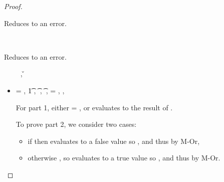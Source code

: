 \begin{lemma}
\begin{proof}
\begin{case}[BE-Assoc2]
  Reduces to an error.
\end{case}

\begin{case}[BE-Assoc3]
  \ 

  Reduces to an error.
\end{case}

\begin{case}[B-IfFalse]
        \opsem {\openv{}} {} {\false}
        \ \ \ \ 
        \opsem {\openv{}} {} {\nil},
        \opsem {\openv{}} {} {\v{}}

  \begin{itemize}
    \item[]
      \begin{subcase}[T-If]
  \ep{} = { {} {}},
  \judgementrewrite {\propenv{}} {\ep1} {\t{1}} { {}}
                 {\object{1}}
                 {},
                 {} {\t{}} { {}}
                 {\object{}}
                 {},
                 {} {\t{}} { {}}
                 {\object{}}
                 {},
  \e{} = { {} {}},
  ,
  \inpropenv{\orprop {\elseprop {\prop{2}}} {\elseprop {\prop{3}}}}{\elseprop{\prop{}}}

              For part 1, either \object{} = \emptyobject{}, or \e{} evaluates to the
              result of \e{3}.

              To prove part 2, we consider two cases:
              \begin{itemize}
                \item if \isfalseval{\v{}}
                  then  evaluates to a false value so {}, and thus
                  {\satisfies{\openv{}}{\orprop {\elseprop {\prop{2}}} {\elseprop {\prop{3}}}}} by M-Or, 
                \item otherwise
                  \istrueval{\v{}},
                  so  evaluates to a true value so {}, and thus
                  {\satisfies{\openv{}}{\orprop {\thenprop {\prop{2}}} {\thenprop {\prop{3}}}}} by M-Or.
              \end{itemize}


\end{subcase}
\end{itemize}
\end{case}
\end{proof}
\end{lemma}
